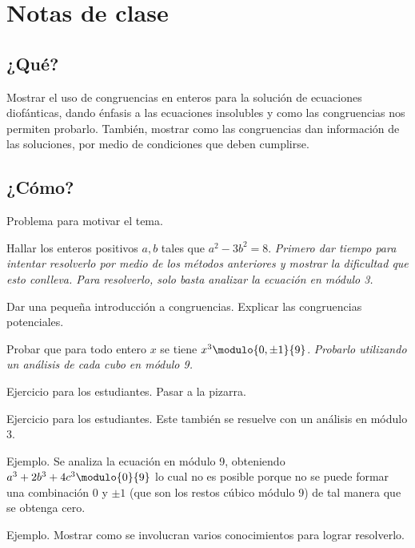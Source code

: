 \newpage
\section{Notas de clase}

\subsection{¿Qué?}

Mostrar el uso de congruencias en enteros para la solución de ecuaciones diofánticas, dando énfasis a las ecuaciones insolubles
y como las congruencias nos permiten probarlo.
También, mostrar como las congruencias dan información de las soluciones, por medio de condiciones que deben cumplirse.

\subsection{¿Cómo?}

Problema para motivar el tema.
\par

\begin{activity}[Ejercicio 3][10 min]
    Hallar los enteros positivos $a,b$ tales que $a^2 - 3b^2 = 8$.
    \textit{Primero dar tiempo para intentar resolverlo por medio de los métodos anteriores y mostrar la dificultad que esto conlleva.
    Para resolverlo, solo basta analizar la ecuación en módulo 3.}
\end{activity}

Dar una pequeña introducción a congruencias.
Explicar las congruencias potenciales.
\begin{activity}[Prop. 6][10 min]
    Probar que para todo entero $x$ se tiene $x^3 \modulo{0,\pm 1}{9}$.
    \textit{Probarlo utilizando un análisis de cada cubo en módulo 9.}
\end{activity}

\begin{activity}[Ejercicio 2][15 min]
    Ejercicio para los estudiantes.
    Pasar a la pizarra.
\end{activity}

\begin{activity}[Ejercicio 8][8 min]
    Ejercicio para los estudiantes.
    Este también se resuelve con un análisis en módulo 3.
\end{activity}

\begin{activity}[Ejercicio 9][15 min]
    Ejemplo.
    Se analiza la ecuación en módulo 9, obteniendo $a^3 + 2b^3 + 4c^3 \modulo{0}{9}$ lo cual no es posible porque no se
    puede formar una combinación 0 y $\pm1$ (que son los restos cúbico módulo 9) de tal manera que se obtenga cero.
\end{activity}

\begin{activity}[Problema 1][20 min]
    Ejemplo.
    Mostrar como se involucran varios conocimientos  para lograr resolverlo.
\end{activity}
